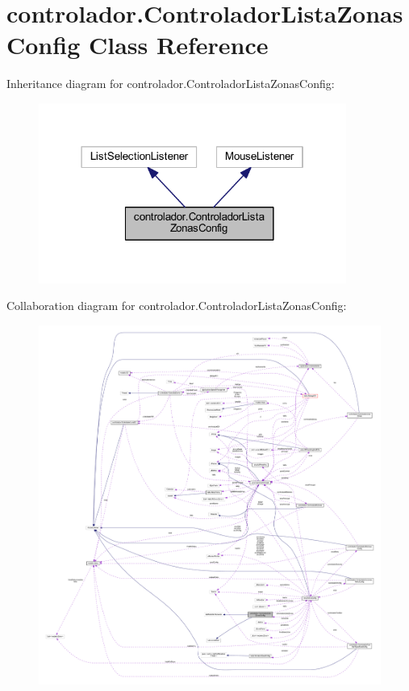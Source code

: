 \hypertarget{classcontrolador_1_1_controlador_lista_zonas_config}{}\section{controlador.\+Controlador\+Lista\+Zonas\+Config Class Reference}
\label{classcontrolador_1_1_controlador_lista_zonas_config}


Inheritance diagram for controlador.\+Controlador\+Lista\+Zonas\+Config\+:
\nopagebreak
\begin{figure}[H]
\begin{center}
\leavevmode
\includegraphics[width=286pt]{classcontrolador_1_1_controlador_lista_zonas_config__inherit__graph}
\end{center}
\end{figure}


Collaboration diagram for controlador.\+Controlador\+Lista\+Zonas\+Config\+:
\nopagebreak
\begin{figure}[H]
\begin{center}
\leavevmode
\includegraphics[width=350pt]{classcontrolador_1_1_controlador_lista_zonas_config__coll__graph}
\end{center}
\end{figure}
